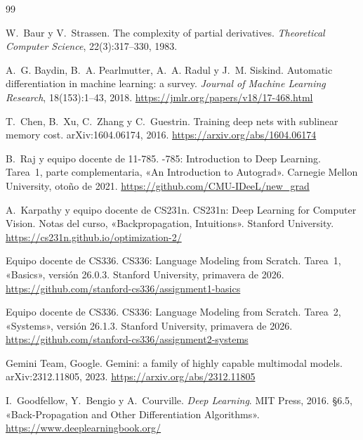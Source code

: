 \begin{thebibliography}{99}
\small

W.~Baur y V.~Strassen.
\newblock The complexity of partial derivatives.
\newblock \emph{Theoretical Computer Science}, 22(3):317--330, 1983.

A.~G. Baydin, B.~A. Pearlmutter, A.~A. Radul y J.~M. Siskind.
\newblock Automatic differentiation in machine learning: a survey.
\newblock \emph{Journal of Machine Learning Research}, 18(153):1--43, 2018.
\newblock \url{https://jmlr.org/papers/v18/17-468.html}

T.~Chen, B.~Xu, C.~Zhang y C.~Guestrin.
\newblock Training deep nets with sublinear memory cost.
\newblock arXiv:1604.06174, 2016.
\newblock \url{https://arxiv.org/abs/1604.06174}

B.~Raj y equipo docente de 11-785.
-785: Introduction to Deep Learning. Tarea~1, parte complementaria, «An Introduction to Autograd».
\newblock Carnegie Mellon University, otoño de 2021.
\newblock \url{https://github.com/CMU-IDeeL/new_grad}

A.~Karpathy y equipo docente de CS231n.
\newblock CS231n: Deep Learning for Computer Vision. Notas del curso, «Backpropagation, Intuitions».
\newblock Stanford University.
\newblock \url{https://cs231n.github.io/optimization-2/}

Equipo docente de CS336.
\newblock CS336: Language Modeling from Scratch. Tarea~1, «Basics», versión 26.0.3.
\newblock Stanford University, primavera de 2026.
\newblock \url{https://github.com/stanford-cs336/assignment1-basics}

Equipo docente de CS336.
\newblock CS336: Language Modeling from Scratch. Tarea~2, «Systems», versión 26.1.3.
\newblock Stanford University, primavera de 2026.
\newblock \url{https://github.com/stanford-cs336/assignment2-systems}

Gemini Team, Google.
\newblock Gemini: a family of highly capable multimodal models.
\newblock arXiv:2312.11805, 2023.
\newblock \url{https://arxiv.org/abs/2312.11805}

I.~Goodfellow, Y.~Bengio y A.~Courville.
\newblock \emph{Deep Learning}.
\newblock MIT Press, 2016.
\newblock §6.5, «Back-Propagation and Other Differentiation Algorithms».
\newblock \url{https://www.deeplearningbook.org/}


\end{thebibliography}
